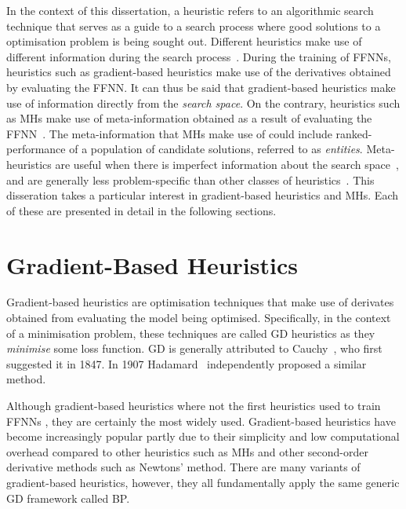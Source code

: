 In the context of this dissertation, a heuristic refers to an algorithmic search technique that serves as a guide to a search process where good solutions to a optimisation problem is being sought out. Different heuristics make use of different information during the search process~\cite{ref:kheiri:2017}. During the training of \acp{FFNN}, heuristics such as gradient-based heuristics make use of the derivatives obtained by evaluating the \acs{FFNN}. It can thus be said that gradient-based heuristics make use of information directly from the \textit{search space}. On the contrary, heuristics such as \acp{MH} make use of meta-information obtained as a result of evaluating the \acs{FFNN}~\cite{ref:blum:2003}. The meta-information that \acp{MH} make use of could include ranked-performance of a population of candidate solutions, referred to as \textit{entities}. Meta-heuristics are useful when there is imperfect information about the search space~\cite{ref:bianchi:2009}, and are generally less problem-specific than other classes of heuristics~\cite{ref:blum:2003}. This disseration takes a particular interest in gradient-based heuristics and \acp{MH}. Each of these are presented in detail in the following sections.


\section{Gradient-Based Heuristics}\label{sec:heuristics:gd}

Gradient-based heuristics are optimisation techniques that make use of derivates obtained from evaluating the model being optimised. Specifically, in the context of a minimisation problem, these techniques are called \acf{GD} heuristics as they \textit{minimise} some loss function. \Acs{GD} is generally attributed to Cauchy~\cite{ref:lemarechal:2012}, who first suggested it in 1847. In 1907 Hadamard~\cite{ref:hadamard:1908} independently proposed a similar method.

Although gradient-based heuristics where not the first heuristics used to train \acp{FFNN}
\cite{ref:engelbrecht:2007}, they are certainly the most widely used. Gradient-based heuristics have become increasingly popular partly due to their simplicity and low computational overhead compared to other heuristics such as \acp{MH} and other second-order derivative methods such as Newtons' method. There are many variants of gradient-based heuristics, however, they all fundamentally apply the same generic \acf{GD} framework called \acf{BP}.

